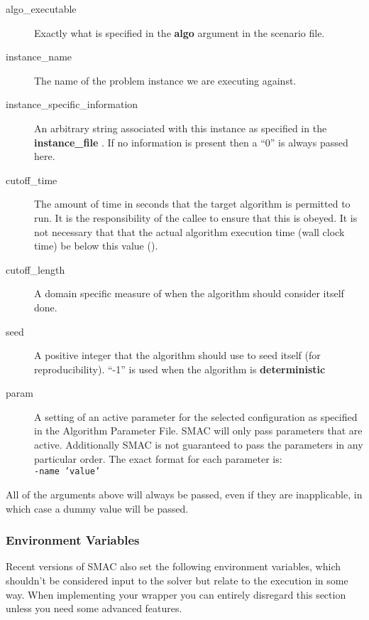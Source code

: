 \documentclass[manual.tex]{subfiles}
\begin{document}
\begin{description}
\item [{algo\_executable}] Exactly what is specified in the \textbf{algo} argument in the scenario file.
 
\item [{instance\_name}] The name of the problem instance we are executing
against.

\item [{instance\_specific\_information}] An arbitrary string associated
with this instance as specified in the \textbf{instance\_file }. If
no information is present then a ``0'' is always passed here. 

\item [{cutoff\_time}] The amount of time in seconds that the target algorithm
is permitted to run. It is the responsibility of the callee
to ensure that this is obeyed. It is not necessary that that the actual
algorithm execution time (wall clock time) be below this value ().

\item [{cutoff\_length}] A domain specific measure of when the algorithm should consider itself done.

\item [{seed}] A positive integer that the algorithm should use to seed
itself (for reproducibility). ``-1'' is used when the algorithm is \textbf{deterministic}

\item [{param}] A setting of an active parameter for the selected configuration
as specified in the Algorithm Parameter File. SMAC will only pass
parameters that are active. Additionally SMAC is not guaranteed
to pass the parameters in any particular order. The exact format for
each parameter is:\\
\texttt{-name~'value'}

\end{description}

All of the arguments above will always be passed, even if they are inapplicable, in which case a dummy value will be passed. \\
\subsubsection*{Environment Variables}
Recent versions of SMAC also set the following environment variables, which shouldn't be considered input to the solver but  relate to the execution in some way. When implementing your wrapper you can entirely disregard this section unless you need some advanced features.
\end{document}
